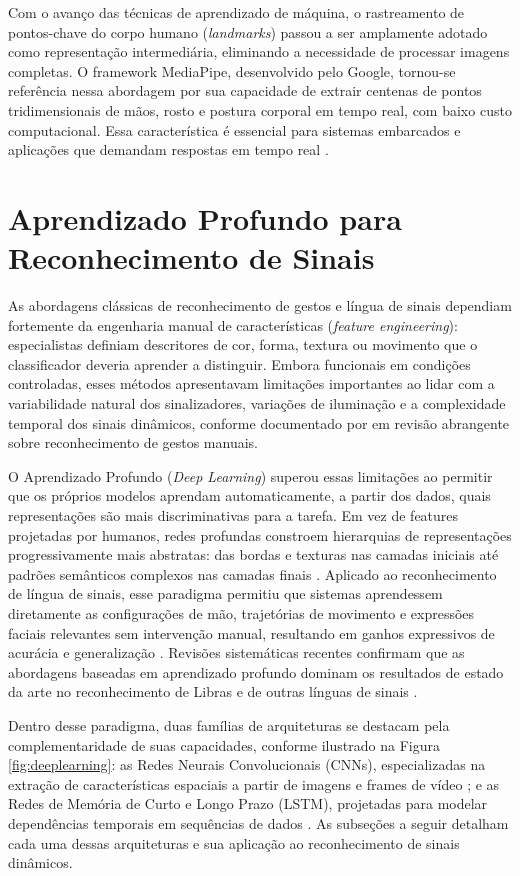 Com o avanço das técnicas de aprendizado de máquina, o rastreamento de pontos-chave do corpo humano (\textit{landmarks}) passou a ser amplamente adotado como representação intermediária, eliminando a necessidade de processar imagens completas. O framework MediaPipe, desenvolvido pelo Google, tornou-se referência nessa abordagem por sua capacidade de extrair centenas de pontos tridimensionais de mãos, rosto e postura corporal em tempo real, com baixo custo computacional. Essa característica é essencial para sistemas embarcados e aplicações que demandam respostas em tempo real \cite{saud:25}.

\section{Aprendizado Profundo para Reconhecimento de Sinais}

As abordagens clássicas de reconhecimento de gestos e língua de sinais dependiam fortemente da engenharia manual de características (\textit{feature engineering}): especialistas definiam descritores de cor, forma, textura ou movimento que o classificador deveria aprender a distinguir. Embora funcionais em condições controladas, esses métodos apresentavam limitações importantes ao lidar com a variabilidade natural dos sinalizadores, variações de iluminação e a complexidade temporal dos sinais dinâmicos, conforme documentado por  em revisão abrangente sobre reconhecimento de gestos manuais.

O Aprendizado Profundo (\textit{Deep Learning}) superou essas limitações ao permitir que os próprios modelos aprendam automaticamente, a partir dos dados, quais representações são mais discriminativas para a tarefa. Em vez de features projetadas por humanos, redes profundas constroem hierarquias de representações progressivamente mais abstratas: das bordas e texturas nas camadas iniciais até padrões semânticos complexos nas camadas finais \cite{li:22}. Aplicado ao reconhecimento de língua de sinais, esse paradigma permitiu que sistemas aprendessem diretamente as configurações de mão, trajetórias de movimento e expressões faciais relevantes sem intervenção manual, resultando em ganhos expressivos de acurácia e generalização \cite{grossi:24}. Revisões sistemáticas recentes confirmam que as abordagens baseadas em aprendizado profundo dominam os resultados de estado da arte no reconhecimento de Libras e de outras línguas de sinais \cite{costa-slr:25, silva-ia:25}.

Dentro desse paradigma, duas famílias de arquiteturas se destacam pela complementaridade de suas capacidades, conforme ilustrado na Figura \ref{fig:deeplearning}: as Redes Neurais Convolucionais (CNNs), especializadas na extração de características espaciais a partir de imagens e frames de vídeo \cite{attili:24}; e as Redes de Memória de Curto e Longo Prazo (LSTM), projetadas para modelar dependências temporais em sequências de dados \cite{kamble:25}. As subseções a seguir detalham cada uma dessas arquiteturas e sua aplicação ao reconhecimento de sinais dinâmicos.

